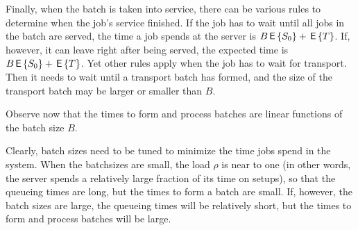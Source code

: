 Finally, when the batch is taken into service, there can be various rules to determine when the job's service finished. If the job has to wait until all jobs in the batch are served, the time a job spends at the server is $B \,\mathsf{E}\left\{S_0\right\} + \,\mathsf{E}\left\{T\right\}$. If, however, it can leave right after being served, the expected time is $B \,\mathsf{E}\left\{S_0\right\} + \,\mathsf{E}\left\{T\right\}$. Yet other rules apply when the job has to wait for transport. Then it needs to wait until a transport batch has formed, and the size of the transport batch may be larger or smaller than $B$. 

Observe now that the times to form and process batches are linear functions of the batch size $B$. 

Clearly, batch sizes need to be tuned to minimize the time jobs spend in the system. When the batchsizes are small, the load $\rho$ is near to one (in other words, the server spends a relatively large fraction of its time on setups), so that the queueing times are long, but the times to form a batch are small. If, however, the batch sizes are large, the queueing times will be relatively short, but the times to form and process batches will be large. 




\clearpage

